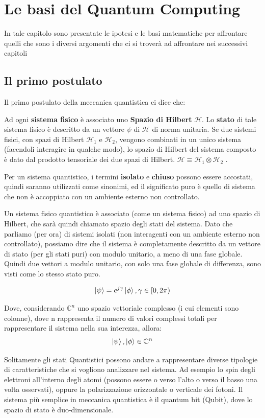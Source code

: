 \chapter{Le basi del Quantum Computing}

In tale capitolo sono presentate le ipotesi e le basi matematiche per affrontare quelli che sono i diversi argomenti che ci si troverà ad affrontare nei successivi capitoli

\section{Il primo postulato}
Il primo postulato della meccanica quantistica ci dice che: 

Ad ogni \textbf{sistema fisico} è associato uno \textbf{Spazio di Hilbert} \(\mathcal{H}\). Lo \textbf{stato} di tale sistema fisico è descritto da un vettore \(\psi\) di \(\mathcal{H}\) di norma unitaria.
Se due sistemi fisici, con spazi di Hilbert \(\mathcal{H}_1\) e \(\mathcal{H}_2\), vengono combinati in un unico sistema (facendoli interagire in qualche modo), lo spazio di Hilbert del sistema composto è dato dal prodotto tensoriale dei due spazi di Hilbert. \(\mathcal{H} \equiv \mathcal{H}_1 \otimes \mathcal{H}_2 \) \cite{giliberti2007limite}.

Per un sistema quantistico, i termini \textbf{isolato} e \textbf{chiuso} possono essere accostati, quindi saranno utilizzati come sinonimi, ed il significato puro è quello di sistema che non è accoppiato con un ambiente esterno non controllato.

Un sistema fisico quantistico è associato (come un sistema fisico) ad uno spazio di Hilbert, che sarà quindi chiamato spazio degli stati del sistema. Dato che parliamo (per ora) di sistemi isolati (non interagenti con un ambiente esterno non controllato), possiamo dire che il sistema è completamente descritto da un vettore di stato (per gli stati puri) con modulo unitario, a meno di una fase globale.
Quindi due vettori a modulo unitario, con solo una fase globale di differenza, sono visti come lo stesso stato puro.

\[
\ket{\psi} = e^{j \gamma} \ket{\phi}, \gamma \in [0,2\pi)
\]

Dove, considerando \(\mathbb{C}^n\) uno spazio vettoriale complesso (i cui elementi sono colonne), dove n rappresenta il numero di valori complessi totali per rappresentare il sistema nella sua interezza, allora:
\[
\ket{\psi}, \ket{\phi} \in \mathbb{C}^n
\]

Solitamente gli stati Quantistici possono andare a rappresentare diverse tipologie di caratteristiche che si vogliono analizzare nel sistema. Ad esempio lo spin degli elettroni all'interno degli atomi (possono essere o verso l'alto o verso il basso una volta osservati), oppure la polarizzazione orizzontale o verticale dei fotoni. 
Il sistema più semplice in meccanica quantistica è il quantum bit (Qubit), dove lo spazio di stato è duo-dimensionale.

